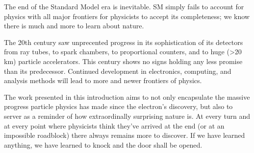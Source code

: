 The end of the Standard Model era is inevitable.
SM simply fails to account for physics with all major frontiers for physicists to accept its completeness; we know there is much and more to learn about nature.

The 20th century saw unprecented progress in its sophistication of its detectors from ray tubes, to spark chambers, to proportional counters, and to huge (>20 km) particle accelerators.
This century shows no signs holding any less promise than its predecessor.
Continued development in electronics, computing, and analysis methods will lead to more and newer frontiers of physics.

The work presented in this introduction aims to not only encapsulate the massive progress particle physics has made since the electron's discovery, but also to server as a reminder of how extraordinally surprising nature is.
At every turn and at every point where physicists think they've arrived at the end (or at an impossible roadblock) there always remains more to discover.
If we have learned anything, we have learned to knock and the door shall be opened.
